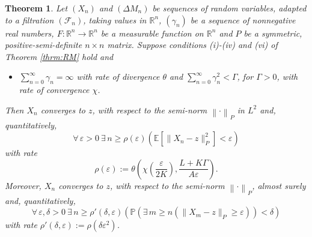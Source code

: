 \documentclass[12pt]{amsart}
\newtheorem{theorem}{Theorem}[section]
\theoremstyle{definition}
\theoremstyle{remark}
\newcommand{\norm}[1]{\left\lVert#1\right\rVert}
\newcommand{\RR}{\mathbb{R}}
\newcommand{\PP}{\mathbb{P}}
\newcommand{\EE}{\mathbb{E}}
\begin{document}
\begin{theorem}
\label{res:RM:quant}
Let $(X_n)$ and $(\Delta M_n)$ be sequences of random variables, adapted to a filtration $(\mathcal{F}_n)$, taking values in $\RR^n$, $(\gamma_n)$ be a sequence of nonnegative real numbers, $F: \RR^n \to \RR^n$ be a measurable function on $\RR^n$ and $P$ be a symmetric, positive-semi-definite $n \times n$ matrix. Suppose conditions (i)-(iv) and (vi) of Theorem \ref{thrm:RM} hold and 
\begin{itemize}
    \item [(v')] $\sum_{n=0}^\infty \gamma_n=\infty$ with rate of divergence $\theta$ and $\sum_{n=0}^\infty \gamma_n^2< \Gamma$, for $\Gamma >0$, with rate of convergence $\chi$.
\end{itemize}
Then $X_n$ converges to $z$, with respect to the semi-norm $\norm{\cdot}_P$ in $L^2$ and, quantitatively,
\[
\forall\, \varepsilon > 0\ \exists\, n \geq \rho(\varepsilon) 
\left(\EE[\|X_n - z\|_P^2] < \varepsilon\right)
\]
with rate
\[
\rho(\varepsilon) := \theta\!\left(\chi\!\left(\frac{\varepsilon}{2K}\right),
\frac{L + K\Gamma}{A\varepsilon}\right).
\]
Moreover, $X_n$ converges to $z$, with respect to the semi-norm $\norm{\cdot}_P$, almost surely and, quantitatively,
\[
\forall\, \varepsilon, \delta > 0\ \exists\, n \geq \rho'(\delta, \varepsilon)
\left(\PP\left(\exists\, m \geq n \left(\|X_m - z\|_P \geq \varepsilon\right)
\right) < \delta\right)
\]
with rate $\rho'(\delta, \varepsilon) := \rho(\delta\varepsilon^2)$.
\end{theorem}
\end{document}
